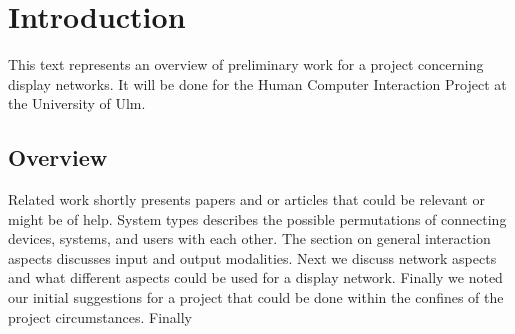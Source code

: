 \section{Introduction}

This text represents an overview of preliminary work for a project concerning display networks.
It will be done for the Human Computer Interaction Project at the University of Ulm.

\subsection{Overview}

Related work shortly presents papers and or articles that could be relevant or might be of help.
System types describes the possible permutations of connecting devices, systems, and users with each other.
The section on general interaction aspects discusses input and output modalities.
Next we discuss network aspects and what different aspects could be used for a display network.
Finally we noted our initial suggestions for a project that could be done within the confines of the project circumstances.
Finally 